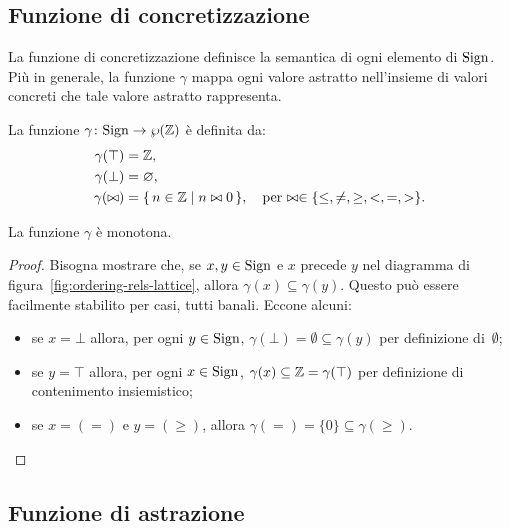\subsection{Funzione di concretizzazione}

La funzione di concretizzazione definisce la semantica di ogni
elemento di $\mathrm{Sign}$. Più in generale, la funzione $\gamma$ mappa ogni
valore astratto nell'insieme di valori concreti che tale valore astratto
rappresenta.
\begin{definizione} 
La funzione $\mathord{\gamma}\colon\mathrm{Sign}\to\wp(\mathbb{Z})$ è definita
da:
\begin{align*}
  \gamma(\top) &= \mathbb{Z}, \\
  \gamma(\bot) &= \varnothing, \\
  \gamma(\bowtie) &= \{\, n \in \mathbb{Z} \mid n \bowtie 0 \,\},
    \quad\text{per $\bowtie \in \{ \leq, \neq, \geq, <, =, > \}$.}
\end{align*}
\end{definizione}

\begin{proposizione}
La funzione $\gamma$ è monotona.
\end{proposizione}
\begin{proof}
Bisogna mostrare che, se $x, y \in \mathrm{Sign}$ e $x$ precede $y$ nel diagramma
di figura~\ref{fig:ordering-rels-lattice}, allora
$\gamma(x) \subseteq \gamma(y)$.
Questo può essere facilmente stabilito per casi, tutti banali.
Eccone alcuni:
\begin{itemize}
\item
se $x = \bot$ allora, per ogni $y \in \mathrm{Sign}$,
$\gamma(\bot) = \emptyset \subseteq \gamma(y)$
per definizione di~$\emptyset$;
\item
se $y = \top$ allora, per ogni $x \in \mathrm{Sign}$,
$\gamma(x) \subseteq \mathbb{Z} = \gamma(\top)$
per definizione di contenimento insiemistico;
\item
se $x = (=)$ e $y = (\geq)$, allora
$\gamma(=) = \{0\} \subseteq \gamma(\geq)$.
\end{itemize}
\end{proof}

\subsection{Funzione di astrazione}

